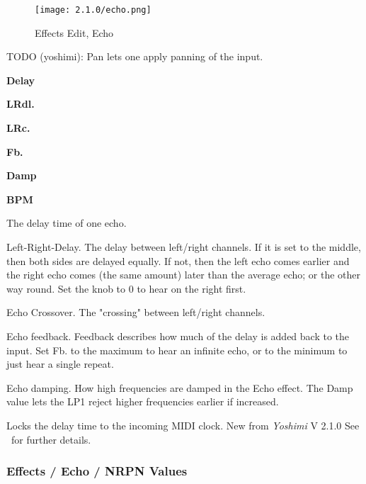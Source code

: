 \begin{figure}[H]
   \centering
   \texttt{[image: 2.1.0/echo.png]}
   \caption{Effects Edit, Echo}
   \label{fig:effects_edit_echo}
\end{figure}

   TODO (yoshimi):  Pan lets one apply panning of the input.

   \begin{enumber}
      \item \textbf{Delay}
      \item \textbf{LRdl.}
      \item \textbf{LRc.}
      \item \textbf{Fb.}
      \item \textbf{Damp}
      \item \textbf{BPM}
   \end{enumber}

   \setcounter{ItemCounter}{0}      %

   The delay time of one echo.

   Left-Right-Delay.
   The delay between left/right channels.
   If it is set to the middle, then both sides are delayed equally. If
   not, then the left echo comes earlier and the right echo comes (the
   same amount) later than the average echo; or the other way round.
   Set the knob to 0 to hear on the right first.

   Echo Crossover.
   The "crossing" between left/right channels.

   Echo feedback.
   Feedback describes how much of the delay is added back to the input.
   Set Fb. to the maximum to hear an infinite echo, or to the minimum to
   just hear a single repeat.

   Echo damping.
   How high frequencies are damped in the Echo effect.
   The Damp value lets the LP1 reject higher frequencies earlier if
   increased.

   Locks the delay time to the incoming MIDI clock. New from
   \textsl{Yoshimi} V 2.1.0 See
   \ for further details.

\subsubsection{Effects / Echo / NRPN Values}
\label{subsubsec:effects_edit_echo_nrpn}

